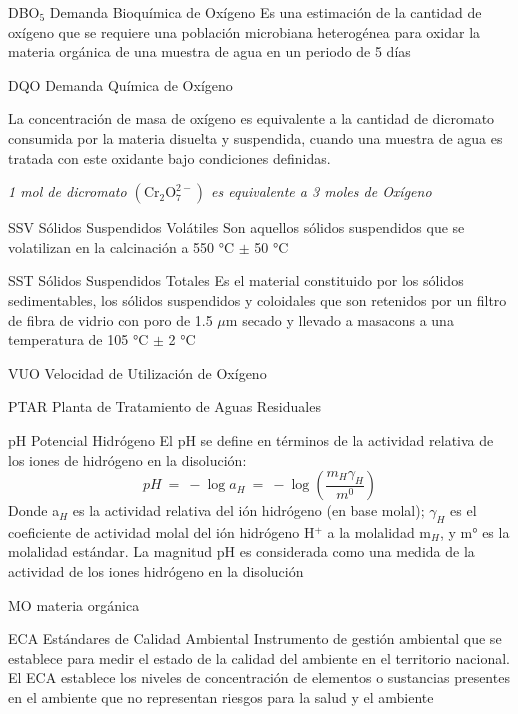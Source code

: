 	{DBO$_{5}$}            %
	{Demanda Bioquímica de Oxígeno}  %
	{Es una estimación de la cantidad de oxígeno que se requiere una población microbiana heterogénea para oxidar la materia orgánica de una muestra de agua en un periodo de 5 días} %

	{DQO}
	{Demanda Química de Oxígeno}
	{La concentración de masa de oxígeno es equivalente a la cantidad de dicromato consumida por la materia disuelta y suspendida, cuando una muestra de agua es tratada con este oxidante bajo condiciones definidas.
		\begin{center}
			\emph{1 mol de dicromato $\mathrm{(Cr_{2}O_{7}^{2-})}$ es equivalente a 3 moles de Oxígeno}
		\end{center}
	}

	{SSV}
	{Sólidos Suspendidos Volátiles}
	{Son aquellos sólidos suspendidos que se volatilizan en la calcinación a 550 °C $\pm$ 50 °C}

	{SST}
	{Sólidos Suspendidos Totales}
	{Es el material constituido por los sólidos sedimentables, los sólidos suspendidos y coloidales que son retenidos por un filtro de fibra de vidrio con poro de 1.5 $\mu$m secado y llevado a \gls{masacons} a una temperatura de 105 °C $\pm$ 2 °C}

	{VUO}
	{Velocidad de Utilización de Oxígeno}
	{}

	{PTAR}
	{Planta de Tratamiento de Aguas Residuales}
	{}

	{pH}
	{Potencial Hidrógeno}
	{El pH se define en términos de la actividad relativa de los iones de hidrógeno en la disolución:
		$$pH\ =\ -\log a_{H}\ =\ -\log (\frac{m_{H}\gamma_{H}}{m^{0}})$$
	Donde a$_{H}$ es la actividad relativa del ión hidrógeno (en base molal); $\gamma_{H}$ es el coeficiente de actividad molal del ión hidrógeno H$^{+}$ a la molalidad m$_{H}$, y m° es la molalidad estándar. La magnitud pH es considerada como una medida de la actividad de los iones hidrógeno en la disolución}

	{MO}
	{materia orgánica}
	{}

	{ECA}
	{Estándares de Calidad Ambiental}
	{Instrumento de gestión ambiental que se establece para medir el estado de la calidad del ambiente en el territorio nacional. El ECA establece los niveles de concentración de elementos o sustancias presentes en el ambiente que no representan riesgos para la salud y el ambiente}

